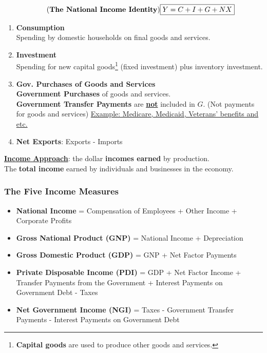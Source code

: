 \documentclass[a4paper]{article}
\begin{document}
\begin{equation}
    \tag{\textbf{The National Income Identity}}
    {\boxed{Y = C + I + G + NX}}
    \end{equation}
    \begin{enumerate}
        \item \textbf{Consumption}\\
        Spending by domestic households on final goods and services.
        \item \textbf{Investment}\\
        Spending for new capital goods\footnote{\textbf{Capital goods} are used to produce other goods and services.
        } (fixed investment) plus inventory investment.
        \item \textbf{Gov. Purchases of Goods and Services} \\
        \textbf{Government Purchases} of goods and services. \smallskip \\
        \textbf{Government Transfer Payments} are \underline{\textbf{not}} included in $G$. (Not payments for goods and services) 
        \underline{Example: Medicare, Medicaid, Veterans’ benefits and etc.}
        \item \textbf{Net Exports}: Exports - Imports
    \end{enumerate}
\pagebreak
\textbf{\underline{Income Approach}}: the dollar \textbf{incomes earned} by production. \smallskip \\
The \textbf{total income} earned by individuals and businesses in the economy. \smallskip \\
\subsubsection*{The Five Income Measures}
\begin{itemize}
    \item \textbf{National Income} = Compensation of Employees + Other Income + Corporate Profits
    \item \textbf{Gross National Product (GNP)} = National Income + Depreciation
    \item \textbf{Gross Domestic Product (GDP)} = GNP + Net Factor Payments
    \item \textbf{Private Disposable Income (PDI)} = GDP + Net Factor Income + Transfer Payments from the Government 
    + Interest Payments on Government Debt - Taxes
    \item \textbf{Net Government Income (NGI)} = Taxes - Government Transfer Payments - Interest Payments on Government Debt
\end{itemize}
\end{document}
